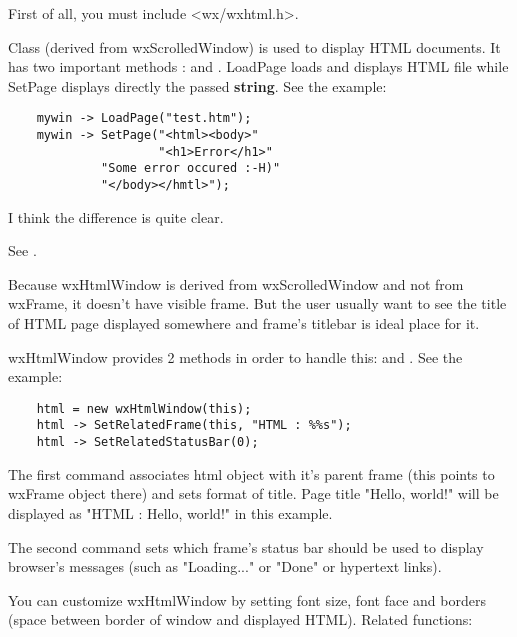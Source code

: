 \label{quickstart}


First of all, you must include <wx/wxhtml.h>.

Class  (derived from wxScrolledWindow)
is used to display HTML documents.
It has two important methods :  
and .
LoadPage loads and displays HTML file while SetPage displays directly the
passed {\bf string}. See the example:

\begin{verbatim}
    mywin -> LoadPage("test.htm");
    mywin -> SetPage("<html><body>"
                     "<h1>Error</h1>"
		     "Some error occured :-H)"
		     "</body></hmtl>");
\end{verbatim}

I think the difference is quite clear.


See .


Because wxHtmlWindow is derived from wxScrolledWindow and not from
wxFrame, it doesn't have visible frame. But the user usually want to see
the title of HTML page displayed somewhere and frame's titlebar is 
ideal place for it.

wxHtmlWindow provides 2 methods in order to handle this: 
 and 
. 
See the example:

\begin{verbatim}
    html = new wxHtmlWindow(this);
    html -> SetRelatedFrame(this, "HTML : %%s");
    html -> SetRelatedStatusBar(0);
\end{verbatim}

The first command associates html object with it's parent frame
(this points to wxFrame object there) and sets format of title.
Page title "Hello, world!" will be displayed as "HTML : Hello, world!"
in this example.

The second command sets which frame's status bar should be used to display
browser's messages (such as "Loading..." or "Done" or hypertext links).


You can customize wxHtmlWindow by setting font size, font face and
borders (space between border of window and displayed HTML). Related functions:

